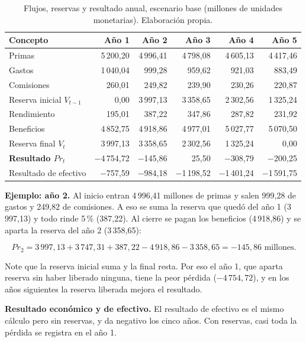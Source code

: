 \documentclass[11pt]{article}
\begin{document}
\begin{table}[htbp]
\centering
\small
\begin{tabular}{lrrrrr}
\toprule
\textbf{Concepto} & \textbf{Año 1} & \textbf{Año 2} & \textbf{Año 3} & \textbf{Año 4} & \textbf{Año 5}\\
\midrule
Primas & 5\,200,20 & 4\,996,41 & 4\,798,08 & 4\,605,13 & 4\,417,46 \\
Gastos & 1\,040,04 & 999,28 & 959,62 & 921,03 & 883,49 \\
Comisiones & 260,01 & 249,82 & 239,90 & 230,26 & 220,87 \\
Reserva inicial $V_{t-1}$ & 0,00 & 3\,997,13 & 3\,358,65 & 2\,302,56 & 1\,325,24 \\
Rendimiento & 195,01 & 387,22 & 347,86 & 287,82 & 231,92 \\
Beneficios & 4\,852,75 & 4\,918,86 & 4\,977,01 & 5\,027,77 & 5\,070,50 \\
Reserva final $V_t$ & 3\,997,13 & 3\,358,65 & 2\,302,56 & 1\,325,24 & 0,00 \\
\midrule
\textbf{Resultado $Pr_t$} & $-$4\,754,72 & $-$145,86 & 25,50 & $-$308,79 & $-$200,25 \\
Resultado de efectivo & $-$757,59 & $-$984,18 & $-$1\,198,52 & $-$1\,401,24 & $-$1\,591,75 \\
\bottomrule
\end{tabular}
\caption{Flujos, reservas y resultado anual, escenario base (millones de unidades monetarias). Elaboración propia.}
\end{table}

\textbf{Ejemplo: año 2.} Al inicio entran 4\,996,41 millones de primas y salen 999,28 de gastos y 249,82 de comisiones. A eso se suma la reserva que quedó del año 1 (3\,997,13) y todo rinde 5\,\% (387,22). Al cierre se pagan los beneficios (4\,918,86) y se aparta la reserva del año 2 (3\,358,65):

\vspace{-0.5cm}

$$
Pr_2 = 3\,997{,}13 + 3\,747{,}31 + 387{,}22 - 4\,918{,}86 - 3\,358{,}65 = -145{,}86 \text{ millones.}
$$

\vspace{-0.2cm}

Note que la reserva inicial suma y la final resta. Por eso el año 1, que aparta reserva sin haber liberado ninguna, tiene la peor pérdida ($-4\,754{,}72$), y en los años siguientes la reserva liberada mejora el resultado.

\textbf{Resultado económico y de efectivo.} El resultado de efectivo es el mismo cálculo pero sin reservas, y da negativo los cinco años. Con reservas, casi toda la pérdida se registra en el año 1.
\end{document}

